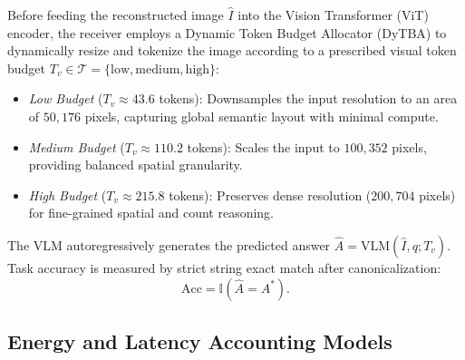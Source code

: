 Before feeding the reconstructed image $\hat{I}$ into the Vision Transformer (ViT) encoder, the receiver employs a Dynamic Token Budget Allocator (DyTBA) to dynamically resize and tokenize the image according to a prescribed visual token budget $T_v \in \mathcal{T} = \{\mathrm{low}, \mathrm{medium}, \mathrm{high}\}$:
\begin{itemize}
    \item \textit{Low Budget} ($T_v \approx 43.6$ tokens): Downsamples the input resolution to an area of $50{,}176$ pixels, capturing global semantic layout with minimal compute.
    \item \textit{Medium Budget} ($T_v \approx 110.2$ tokens): Scales the input to $100{,}352$ pixels, providing balanced spatial granularity.
    \item \textit{High Budget} ($T_v \approx 215.8$ tokens): Preserves dense resolution ($200{,}704$ pixels) for fine-grained spatial and count reasoning.
\end{itemize}
The VLM autoregressively generates the predicted answer $\hat{A} = \mathrm{VLM}(\hat{I}, q; T_v)$. Task accuracy is measured by strict string exact match after canonicalization:
\begin{equation}
\mathrm{Acc} = \mathbb{I}(\hat{A} = A^*).
\end{equation}

\subsection{Energy and Latency Accounting Models}
